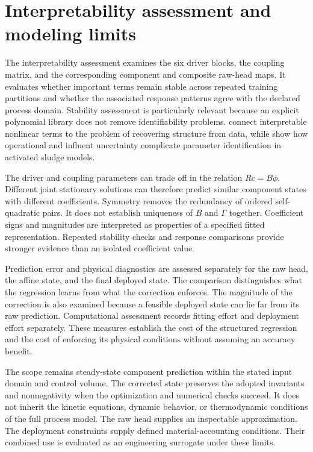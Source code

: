 \section{Interpretability assessment and modeling limits}

The interpretability assessment examines the six driver blocks, the coupling matrix, and the corresponding component and composite raw-head maps. It evaluates whether important terms remain stable across repeated training partitions and whether the associated response patterns agree with the declared process domain. Stability assessment is particularly relevant because an explicit polynomial library does not remove identifiability problems. \citet{Brunton2016} connect interpretable nonlinear terms to the problem of recovering structure from data, while \citet{Machado2014} show how operational and influent uncertainty complicate parameter identification in activated sludge models.

The driver and coupling parameters can trade off in the relation \(Rc=B\phi\). Different joint stationary solutions can therefore predict similar component states with different coefficients. Symmetry removes the redundancy of ordered self-quadratic pairs. It does not establish uniqueness of \(B\) and \(\Gamma\) together. Coefficient signs and magnitudes are interpreted as properties of a specified fitted representation. Repeated stability checks and response comparisons provide stronger evidence than an isolated coefficient value.

Prediction error and physical diagnostics are assessed separately for the raw head, the affine state, and the final deployed state. The comparison distinguishes what the regression learns from what the correction enforces. The magnitude of the correction is also examined because a feasible deployed state can lie far from its raw prediction. Computational assessment records fitting effort and deployment effort separately. These measures establish the cost of the structured regression and the cost of enforcing its physical conditions without assuming an accuracy benefit.

The scope remains steady-state component prediction within the stated input domain and control volume. The corrected state preserves the adopted invariants and nonnegativity when the optimization and numerical checks succeed. It does not inherit the kinetic equations, dynamic behavior, or thermodynamic conditions of the full process model. The raw head supplies an inspectable approximation. The deployment constraints supply defined material-accounting conditions. Their combined use is evaluated as an engineering surrogate under these limits.
